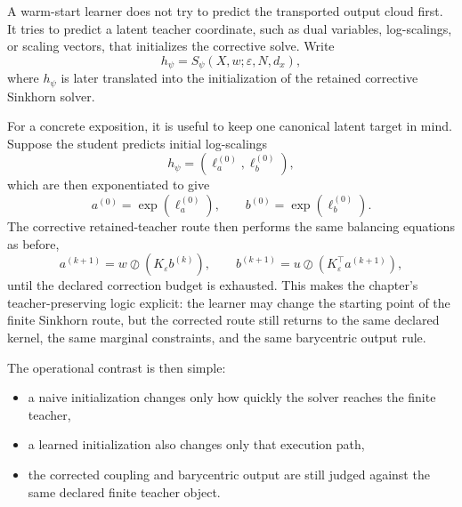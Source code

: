 A warm-start learner does not try to predict the transported output cloud first.
It tries to predict a latent teacher coordinate, such as dual variables,
log-scalings, or scaling vectors, that initializes the corrective solve.  Write
\begin{equation}
\label{eq:bf-learned-ot-student-map}
  h_\psi = S_\psi(X,w;\varepsilon,N,d_x),
\end{equation}
where \(h_\psi\) is later translated into the initialization of the retained
corrective Sinkhorn solver.

For a concrete exposition, it is useful to keep one canonical latent target in
mind.  Suppose the student predicts initial log-scalings
\begin{equation}
\label{eq:bf-learned-ot-logscaling-student}
  h_\psi
  =
  (\ell_a^{(0)},\ell_b^{(0)}),
\end{equation}
which are then exponentiated to give
\begin{equation}
\label{eq:bf-learned-ot-scaling-init}
  a^{(0)}=\exp(\ell_a^{(0)}),
  \qquad
  b^{(0)}=\exp(\ell_b^{(0)}).
\end{equation}
The corrective retained-teacher route then performs the same balancing equations as
before,
\begin{equation}
\label{eq:bf-learned-ot-corrective-updates}
  a^{(k+1)} = w \oslash (K_\varepsilon b^{(k)}),
  \qquad
  b^{(k+1)} = u \oslash (K_\varepsilon^\top a^{(k+1)}),
\end{equation}
until the declared correction budget is exhausted.  This makes the chapter's
teacher-preserving logic explicit: the learner may change the starting point of the
finite Sinkhorn route, but the corrected route still returns to the same declared
kernel, the same marginal constraints, and the same barycentric output rule.

The operational contrast is then simple:
\begin{itemize}
  \item a naive initialization changes only how quickly the solver reaches the
  finite teacher,
  \item a learned initialization also changes only that execution path,
  \item the corrected coupling and barycentric output are still judged against
  the same declared finite teacher object.
\end{itemize}

